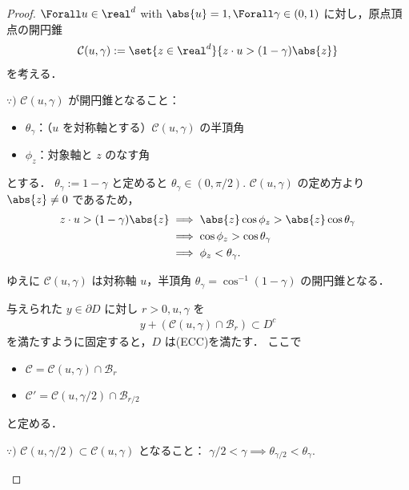 \documentclass{jsarticle}
\begin{document}
\begin{proof}
    $\Forall u\in\real^d$ with $\abs{u}=1, \Forall \gamma\in(0, 1)$ に対し，原点頂点の開円錐
    \begin{align}
        \mathcal{C}(u, \gamma)
        := \set{z\in\real^d}{z\cdot u>(1-\gamma)\abs{z}}
    \end{align}
    を考える．

    \begin{screen}
        $\because)$ $\mathcal{C}(u, \gamma)$ が開円錐となること：
        \begin{itemize}
            \item $\theta_{\gamma}$：（$u$ を対称軸とする）$\mathcal{C}(u, \gamma)$ の半頂角
            \item $\phi_z$：対象軸と $z$ のなす角
        \end{itemize}
        とする．
        $\theta_{\gamma}:=1-\gamma$ と定めると $\theta_{\gamma}\in(0, \pi/2).$
        $\mathcal{C}(u, \gamma)$ の定め方より $\abs{z}\neq0$ であるため，
        \begin{align}
            z\cdot u>(1-\gamma)\abs{z}
            &\implies \abs{z}\cos\phi_z > \abs{z}\cos\theta_{\gamma} \\
            &\implies \cos\phi_z > \cos\theta_{\gamma} \\
            &\implies \phi_z < \theta_{\gamma}.
        \end{align}

        ゆえに $\mathcal{C}(u, \gamma)$ は対称軸 $u$，半頂角 $\theta_{\gamma}=\cos^{-1}(1-\gamma)$ の開円錐となる．
    \end{screen}
    
    与えられた $y\in\partial D$ に対し $r>0, u, \gamma$ を
    \begin{align}
        y+(\mathcal{C}(u, \gamma)\cap\mathcal{B}_{r})\subset D^c
    \end{align}
    を満たすように固定すると，$D$ は(ECC)を満たす．
    ここで
    \begin{itemize}
        \item $\mathcal{C}=\mathcal{C}(u, \gamma)\cap\mathcal{B}_{r}$
        \item $\mathcal{C}'=\mathcal{C}(u, \gamma/2)\cap\mathcal{B}_{r/2}$
    \end{itemize}
    と定める．
    
    \begin{screen}
        $\because)$
        $\mathcal{C}(u, \gamma/2)\subset \mathcal{C}(u, \gamma)$ となること：
        $\gamma/2<\gamma\implies \theta_{\gamma/2}<\theta_{\gamma}.$
    \end{screen}


\end{proof}
\end{document}
